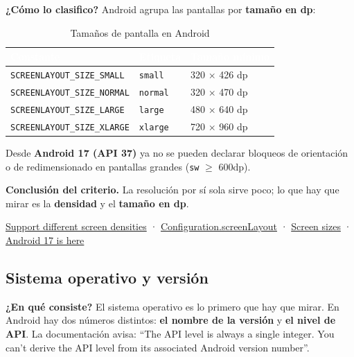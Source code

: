 \documentclass[11pt,a4paper]{article}
\newcommand{\code}[1]{\texttt{\color{primary}#1}}
\newcommand{\campo}[1]{\textbf{\color{primary}#1}}
\begin{document}
	\textbf{\color{primary}¿Cómo lo clasifico?}
	Android agrupa las pantallas por \textbf{tamaño en dp}:
	
	\begin{table}[htbp]
		\centering
		\small
		\begin{tabular}{@{}l l l@{}}
			\toprule
			\rowcolor{primary}
			\textcolor{white}{\sffamily\bfseries Constante} & \textcolor{white}{\sffamily\bfseries Etiqueta} & \textcolor{white}{\sffamily\bfseries Tamaño mínimo} \\
			\midrule
			\code{SCREENLAYOUT\_SIZE\_SMALL} & \code{small} & 320 $\times$ 426 dp \\
			\rowcolor{soft}
			\code{SCREENLAYOUT\_SIZE\_NORMAL} & \code{normal} & 320 $\times$ 470 dp \\
			\code{SCREENLAYOUT\_SIZE\_LARGE} & \code{large} & 480 $\times$ 640 dp \\
			\rowcolor{soft}
			\code{SCREENLAYOUT\_SIZE\_XLARGE} & \code{xlarge} & 720 $\times$ 960 dp \\
			\bottomrule
		\end{tabular}
		\caption{Tamaños de pantalla en Android}
	\end{table}
	
	Desde \textbf{Android 17 (API 37)} ya no se pueden declarar bloqueos de orientación o de redimensionado en pantallas grandes (\code{sw} $\geq$ 600dp).
	
	\campo{Conclusión del criterio.} La resolución por sí sola sirve poco; lo que hay que mirar es la \textbf{densidad} y el \textbf{tamaño en dp}.
	
	\begin{fuentesbox}
		\href{https://developer.android.com/training/multiscreen/screendensities}{Support different screen densities} ·
		\href{https://developer.android.com/reference/android/content/res/Configuration}{Configuration.screenLayout} ·
		\href{https://developer.android.com/training/multiscreen/screensizes}{Screen sizes} ·
		\href{https://developer.android.com/blog/posts/android-17-is-here}{Android 17 is here}
	\end{fuentesbox}
	
	\subsection{Sistema operativo y versión}
	
	\campo{¿En qué consiste?}
	El sistema operativo es lo primero que hay que mirar. En Android hay dos números distintos: \textbf{el nombre de la versión} y \textbf{el nivel de API}. La documentación avisa: \enquote{The API level is always a single integer. You can't derive the API level from its associated Android version number}.
	
\end{document}
